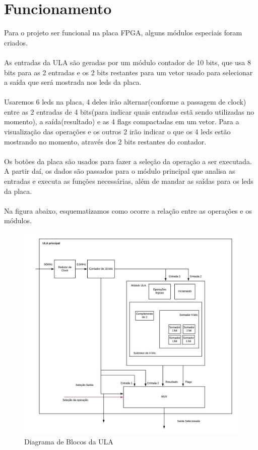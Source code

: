 \documentclass[a4paper,12pt,twoside]{article}
\begin{document}
\section{Funcionamento}
Para o projeto ser funcional na placa FPGA, alguns módulos especiais foram criados. \\ \\
As entradas da ULA são geradas por um módulo contador de 10 bits, que usa 8 bits para as 2 entradas e os 2 bits restantes para um vetor  usado para selecionar a saída que será mostrada nos leds da placa. 
\\ \\ Usaremos 6 leds na placa, 4 deles irão alternar(conforme a passagem de clock) entre as 2 entradas de 4 bits(para indicar quais entradas estã sendo utilizadas no momento), a saída(resultado) e as 4 flags compactadas em um vetor. Para a visualização das operações e os outros 2 irão indicar o que os 4 leds estão mostrando no momento, através dos 2 bits restantes do contador.  \\ \\
Os botões da placa são usados para fazer a seleção da operação a ser executada. A partir daí, os dados são passados para o módulo principal que analisa as entradas e executa as funções necessárias, além de mandar as saídas para os leds da placa.  \\ \\
    Na figura abaixo, esquematizamos como ocorre a relação entre as operações e os módulos.

\begin{figure}[H]
\centering
\includegraphics[scale=0.8]{diagrama.jpeg}
\caption{Diagrama de Blocos da ULA}
\label{fig:diagrama}
\end{figure}
\end{document}
